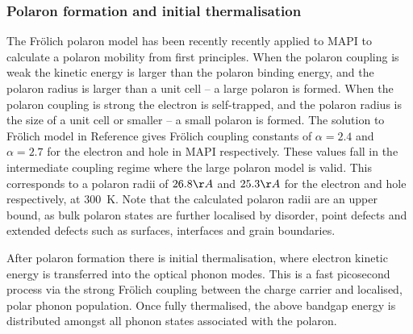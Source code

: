 \begin{table}
\subsubsection{Polaron formation and initial thermalisation}
The Fr\"{o}lich polaron model has been recently recently applied to MAPI to calculate a polaron mobility from first principles.\autocite{Frost2017b} %
When the polaron coupling is weak the kinetic energy is larger than the polaron binding energy, and the polaron radius is larger than a unit cell -- a large polaron is formed. When the polaron coupling is strong the electron is self-trapped, and the polaron radius is the size of a unit cell or smaller -- a small polaron is formed. The solution to Fr\"{o}lich model in Reference \cite{Frost2017b} gives Fr\"{o}lich coupling constants of $\alpha=2.4$ and $\alpha=2.7$ for the electron and hole in MAPI respectively. These values fall in the intermediate coupling regime where the large polaron model is valid. This corresponds to a polaron radii of $26.8\AA$ and $25.3\AA$ for the electron and hole respectively, at \SI{300}{\K}.
Note that the calculated polaron radii are an upper bound, as bulk polaron states are further localised by disorder, point defects and extended defects such as surfaces, interfaces and grain boundaries.

After polaron formation there is initial thermalisation, where electron kinetic energy is transferred into the optical phonon modes. This is a fast picosecond process via the strong Fr\"{o}lich coupling between the charge carrier and localised, polar phonon population. Once fully thermalised, the above bandgap energy is distributed amongst all phonon states associated with the polaron.


\end{table}
